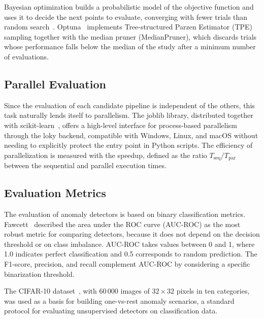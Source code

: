 \documentclass[conference]{IEEEtran}
\begin{document}
Bayesian optimization builds a probabilistic model of the objective function
and uses it to decide the next points to evaluate, converging with fewer
trials than random search~\cite{snoek2012practical}.
Optuna~\cite{akiba2019optuna} implements Tree-structured Parzen Estimator
(TPE) sampling together with the median pruner (MedianPruner), which discards
trials whose performance falls below the median of the study after a minimum
number of evaluations.

\subsection{Parallel Evaluation}

Since the evaluation of each candidate pipeline is independent of the others,
this task naturally lends itself to parallelism. The joblib library,
distributed together with scikit-learn~\cite{pedregosa2011sklearn}, offers a
high-level interface for process-based parallelism through the loky backend,
compatible with Windows, Linux, and macOS without needing to explicitly
protect the entry point in Python scripts. The efficiency of parallelization
is measured with the speedup, defined as the ratio
$T_{\text{seq}} / T_{\text{par}}$ between the sequential and parallel
execution times.

\subsection{Evaluation Metrics}

The evaluation of anomaly detectors is based on binary classification metrics.
Fawcett~\cite{fawcett2006roc} described the area under the ROC curve (AUC-ROC)
as the most robust metric for comparing detectors, because it does not depend
on the decision threshold or on class imbalance. AUC-ROC takes values between
0 and 1, where 1.0 indicates perfect classification and 0.5 corresponds to
random prediction. The F1-score, precision, and recall complement AUC-ROC by
considering a specific binarization threshold.

The CIFAR-10 dataset~\cite{krizhevsky2009cifar}, with 60\,000 images of
$32\times32$ pixels in ten categories, was used as a basis for building
one-vs-rest anomaly scenarios, a standard protocol for evaluating unsupervised
detectors on classification data.

\end{document}
